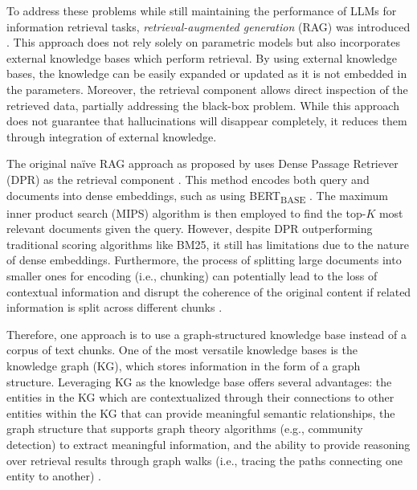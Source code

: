 To address these problems while still maintaining the performance of LLMs for information retrieval tasks, \textit{retrieval-augmented generation} (RAG) was introduced \citep{lewis2021retrievalaugmentedgenerationknowledgeintensivenlp}. This approach does not rely solely on parametric models but also incorporates external knowledge bases which perform retrieval. By using external knowledge bases, the knowledge can be easily expanded or updated as it is not embedded in the parameters. Moreover, the retrieval component allows direct inspection of the retrieved data, partially addressing the black-box problem. While this approach does not guarantee that hallucinations will disappear completely, it reduces them through integration of external knowledge.

The original na\"{i}ve RAG approach as proposed by \cite{lewis2021retrievalaugmentedgenerationknowledgeintensivenlp} uses Dense Passage Retriever (DPR) as the retrieval component \citep{karpukhin2020densepassageretrievalopendomain}. This method encodes both query and documents into dense embeddings, such as using BERT\textsubscript{BASE} \citep{lewis2021retrievalaugmentedgenerationknowledgeintensivenlp}. The maximum inner product search (MIPS) algorithm is then employed to find the top-$K$ most relevant documents given the query. However, despite DPR outperforming traditional scoring algorithms like BM25, it still has limitations due to the nature of dense embeddings. Furthermore, the process of splitting large documents into smaller ones for encoding (i.e., chunking) can potentially lead to the loss of contextual information and disrupt the coherence of the original content if related information is split across different chunks \citep{sarmah2024hybridragintegratingknowledgegraphs}.

Therefore, one approach is to use a graph-structured knowledge base instead of a corpus of text chunks. One of the most versatile knowledge bases is the knowledge graph (KG), which stores information in the form of a graph structure. Leveraging KG as the knowledge base offers several advantages: the entities in the KG which are contextualized through their connections to other entities within the KG that can provide meaningful semantic relationships, the graph structure that supports graph theory algorithms (e.g., community detection) to extract meaningful information, and the ability to provide reasoning over retrieval results through graph walks (i.e., tracing the paths connecting one entity to another) \citep{informatics9010006}.

